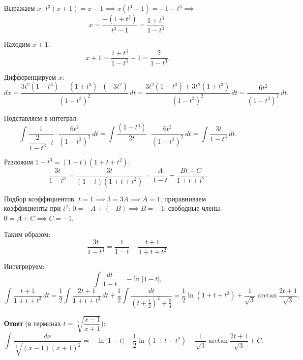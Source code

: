 Выражаем $x$: $t^3(x+1) = x-1 \implies x(t^3-1) = -1-t^3 \implies$
\[
x = \frac{-(1+t^3)}{t^3-1} = \frac{1+t^3}{1-t^3}.
\]

Находим $x+1$:
\[
x+1 = \frac{1+t^3}{1-t^3}+1 = \frac{2}{1-t^3}.
\]

Дифференцируем $x$:
\[
dx = \frac{3t^2(1-t^3)-\,(1+t^3)\cdot(-3t^2)}{(1-t^3)^2}\,dt
= \frac{3t^2(1-t^3)+3t^2(1+t^3)}{(1-t^3)^2}\,dt
= \frac{6t^2}{(1-t^3)^2}\,dt.
\]

Подставляем в интеграл:
\[
\int \frac{1}{\dfrac{2}{1-t^3}\cdot t}\cdot\frac{6t^2}{(1-t^3)^2}\,dt
= \int \frac{(1-t^3)}{2t}\cdot\frac{6t^2}{(1-t^3)^2}\,dt
= \int \frac{3t}{1-t^3}\,dt.
\]

Разложим $1-t^3 = (1-t)(1+t+t^2)$:
\[
\frac{3t}{1-t^3} = \frac{3t}{(1-t)(1+t+t^2)} = \frac{A}{1-t} + \frac{Bt+C}{1+t+t^2}.
\]

Подбор коэффициентов: $t=1 \implies 3 = 3A \implies A=1$;
приравниваем коэффициенты при $t^2$: $0 = -A + (-B) \implies B = -1$;
свободные члены: $0 = A+C \implies C = -1$.

Таким образом:
\[
\frac{3t}{1-t^3} = \frac{1}{1-t} - \frac{t+1}{1+t+t^2}.
\]

Интегрируем:
\[
\int\frac{dt}{1-t} = -\ln|1-t|,
\]
\[
\int\frac{t+1}{1+t+t^2}\,dt
= \frac{1}{2}\int\frac{2t+1}{1+t+t^2}\,dt + \frac{1}{2}\int\frac{dt}{(t+\frac{1}{2})^2+\frac{3}{4}}
= \frac{1}{2}\ln(1+t+t^2) + \frac{1}{\sqrt{3}}\arctan\frac{2t+1}{\sqrt{3}}.
\]

\textbf{Ответ} (в терминах $t = \sqrt[3]{\dfrac{x-1}{x+1}}$):
\[
\boxed{
\int\frac{dx}{\sqrt[3]{(x-1)(x+1)^2}}
= -\ln|1-t| - \frac{1}{2}\ln(1+t+t^2) - \frac{1}{\sqrt{3}}\arctan\frac{2t+1}{\sqrt{3}} + C.
}
\]